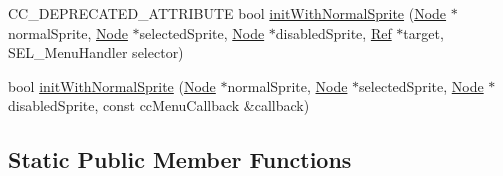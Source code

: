 \begin{DoxyCompactItemize}
\item 
C\+C\+\_\+\+D\+E\+P\+R\+E\+C\+A\+T\+E\+D\+\_\+\+A\+T\+T\+R\+I\+B\+U\+TE bool \hyperlink{classMenuItemSprite_a6f749eaf6a4bb0d69bdb2f1b63e010e5}{init\+With\+Normal\+Sprite} (\hyperlink{classNode}{Node} $\ast$normal\+Sprite, \hyperlink{classNode}{Node} $\ast$selected\+Sprite, \hyperlink{classNode}{Node} $\ast$disabled\+Sprite, \hyperlink{classRef}{Ref} $\ast$target, S\+E\+L\+\_\+\+Menu\+Handler selector)
\item 
bool \hyperlink{classMenuItemSprite_a2cbb85645b77b5e6a356212dea870ad2}{init\+With\+Normal\+Sprite} (\hyperlink{classNode}{Node} $\ast$normal\+Sprite, \hyperlink{classNode}{Node} $\ast$selected\+Sprite, \hyperlink{classNode}{Node} $\ast$disabled\+Sprite, const cc\+Menu\+Callback \&callback)
\end{DoxyCompactItemize}
\subsection*{Static Public Member Functions}
